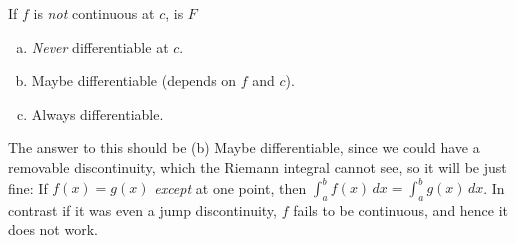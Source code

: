 \begin{fft}
	If \(f\) is \emph{not} continuous at \(c\), is \(F\)
	\begin{enumerate}[(a)]
		\item \emph{Never} differentiable at \(c\).
		
		\item Maybe differentiable (depends on \(f\) and \(c\)).
		
		\item Always differentiable. 
	\end{enumerate}
\end{fft}
The answer to this should be (b) Maybe differentiable, since we could have a removable discontinuity, which the Riemann integral cannot see, so it will be just fine: If \(f(x)=g(x)\) \emph{except} at one point, then \(\displaystyle\int_a^b f(x) \, dx=\int_a^b g(x)\, dx\). In contrast if it was even a jump discontinuity, \(f\) fails to be continuous, and hence it does not work.